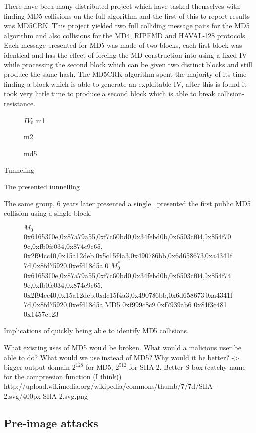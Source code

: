 \documentclass[a4paper,12pt]{article}
\begin{document}
There have been many distributed project which have tasked themselves with finding MD5 collisions on the full algorithm and the first of this to report results was MD5CRK\cite{cryptoeprint:2004:199}. This project yielded two full colliding message pairs for the MD5 algorithm and also collisions for the MD4, RIPEMD and HAVAL-128 protocols. Each message presented for MD5 was made of two blocks, each first block was identical and has the effect of forcing the MD construction into using a fixed IV while processing the second block which can be given two distinct blocks and still produce the same hash. The MD5CRK algorithm spent the majority of its time finding a block which is able to generate an exploitable IV, after this is found it took very little time to produce a second block which is able to break collision-resistance.
\begin{figure}
	$IV_0$
	m1

	m2

	md5
\caption{}
\end{figure}

Tunneling

The  \cite{Klima2006} presented tunnelling 

The same group, 6 years later presented a single \cite{Xie2013}, presented the first public MD5 collision using a single block.
\begin{figure}
$M_0$
0x6165300e,0x87a79a55,0xf7c60bd0,0x34febd0b,0x6503cf04,0x854f709e,0xfb0fc034,0x874c9c65, 0x2f94cc40,0x15a12deb,0x5c15f4a3,0x490786bb,0x6d658673,0xa4341f7d,0x8fd75920,0xefd18d5a
0
$M_0^*$
0x6165300e,0x87a79a55,0xf7c60bd0,0x34febd0b,0x6503cf04,0x854f749e,0xfb0fc034,0x874c9c65, 0x2f94cc40,0x15a12deb,0xdc15f4a3,0x490786bb,0x6d658673,0xa4341f7d,0x8fd75920,0xefd18d5a
MD5 0xf999c8c9 0xf7939ab6 0x84f3c481 0x1457cb23

\end{figure}

Implications of quickly being able to identify MD5 collisions.

What existing uses of MD5 would be broken. What would a malicious user be able to do?
What would we use instead of MD5?
Why would it be better? -> bigger output domain $2^128$ for MD5, $2^512$ for SHA-2.
Better S-box (catchy name for the compression function (I think)) http://upload.wikimedia.org/wikipedia/commons/thumb/7/7d/SHA-2.svg/400px-SHA-2.svg.png



\subsection{Pre-image attacks}
\end{document}
